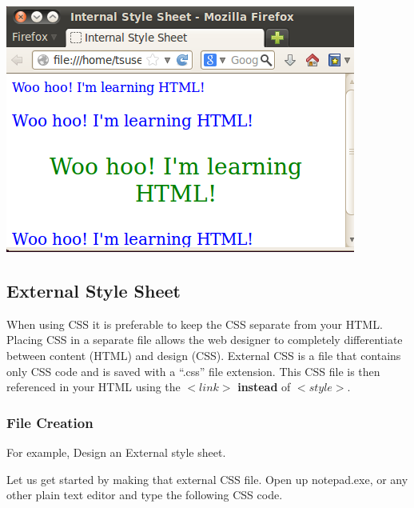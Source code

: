 \documentclass[11pt,a4paper]{article}
\begin{document}
\begin{center}
\includegraphics[scale=0.8]{InternalStyleSheet}
\end{center}
\pagebreak

\subsection*{External Style Sheet} 

When using CSS it is preferable to keep the CSS separate from your HTML. Placing CSS in a separate file allows the web designer to completely differentiate between content (HTML) and design (CSS). External CSS is a file that contains only CSS code and is saved with a ``.css'' file extension. This CSS file is then referenced in your HTML using the $<link>$ \textbf{instead} of $<style>$.

\subsubsection*{File Creation}

For example, Design an External style sheet.

Let us get started by making that external CSS file. Open up notepad.exe, or any other plain text editor and type the following CSS code.
\end{document}
